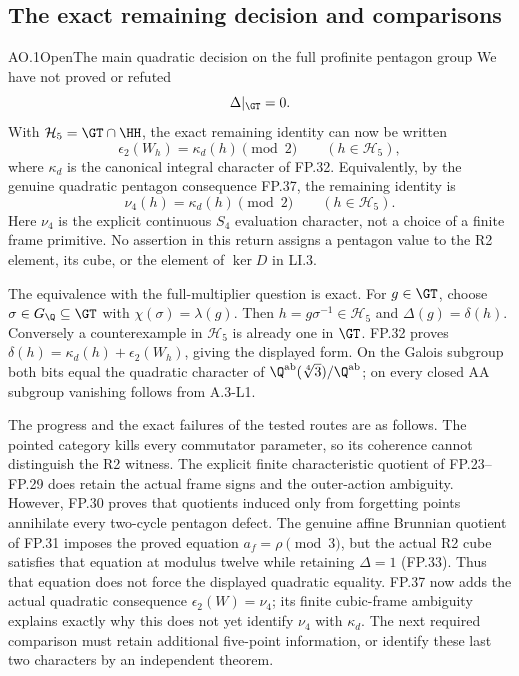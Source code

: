 \subsection{The exact remaining decision and comparisons}

\begin{statement}{AO.1}{Open}{The main quadratic decision on the full profinite pentagon group}
We have not proved or refuted
\[
                    \Delta|_{\GT}=0.
\]
With $\mathcal H_5=\GT\cap\HH$, the exact remaining identity
can now be written
\[
 \epsilon_2(W_h)=\kappa_d(h)\pmod2
                      \qquad(h\in\mathcal H_5),
\]
where $\kappa_d$ is the canonical integral character of FP.32.
Equivalently, by the genuine quadratic pentagon consequence
FP.37, the remaining identity is
\[
                 \nu_4(h)=\kappa_d(h)\pmod2
                    \qquad(h\in\mathcal H_5).
\]
Here $\nu_4$ is the explicit continuous $S_4$ evaluation
character, not a choice of a finite frame primitive.
No assertion in this return assigns a pentagon value to the R2
element, its cube, or the element of $\ker D$ in LI.3.
\end{statement}
The equivalence with the full-multiplier question is exact.
For $g\in\GT$, choose $\sigma\in G_{\Q}\subseteq\GT$ with
$\chi(\sigma)=\lambda(g)$. Then $h=g\sigma^{-1}\in\mathcal H_5$
and $\Delta(g)=\delta(h)$. Conversely a counterexample in
$\mathcal H_5$ is already one in $\GT$. FP.32 proves
$\delta(h)=\kappa_d(h)+\epsilon_2(W_h)$, giving the displayed
form. On the Galois subgroup both bits equal the quadratic
character of $\Q^{\rm ab}(\sqrt[4]3)/\Q^{\rm ab}$; on every
closed AA subgroup vanishing follows from A.3-L1.

The progress and the exact failures of the tested routes are as
follows. The pointed category kills every commutator parameter,
so its coherence cannot distinguish the R2 witness. The explicit
finite characteristic quotient of FP.23--FP.29 does retain the
actual frame signs and the outer-action ambiguity. However,
FP.30 proves that quotients induced only from forgetting points
annihilate every two-cycle pentagon defect. The genuine affine
Brunnian quotient of FP.31 imposes the proved equation
$a_f=\rho\pmod3$, but the actual R2 cube satisfies that equation
at modulus twelve while retaining $\Delta=1$ (FP.33).
Thus that equation does not force the displayed quadratic equality.
FP.37 now adds the actual quadratic consequence
$\epsilon_2(W)=\nu_4$; its finite cubic-frame ambiguity explains
exactly why this does not yet identify $\nu_4$ with $\kappa_d$.
The next required comparison must retain additional five-point
information, or identify these last two characters by an
independent theorem.

